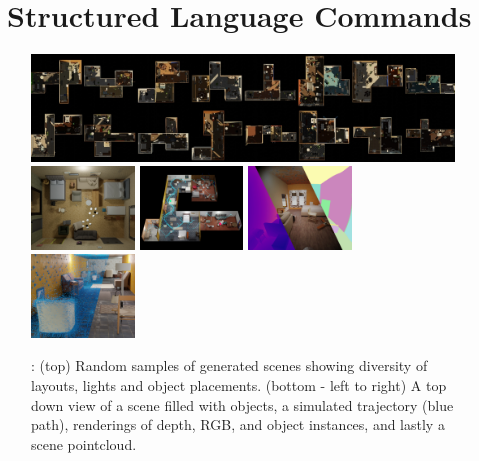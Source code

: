 \section{\METHOD~Structured Language Commands}
\label{section:ssl}


\begin{figure}[t]
\includegraphics[width=\textwidth]{figs/ASE-2-row.jpg}
\includegraphics[width=0.245\textwidth]{figs/ase_scene_top_down.jpg} 
\includegraphics[width=0.245\textwidth]{figs/ase_scene_trajectory.jpg} 
\includegraphics[width=0.245\textwidth]{figs/ase_modalities.jpg} 
\includegraphics[width=0.245\textwidth]{figs/ase_pointcloud.jpg}
\caption{\DatasetName:
(top) Random samples of generated scenes showing diversity of layouts, lights and object placements. (bottom - left to right) A top down view of a scene filled with objects, a simulated trajectory (blue path), renderings of depth, RGB, and object instances, and lastly a scene pointcloud.}
\label{fig:dataset_teaser}
\end{figure}



